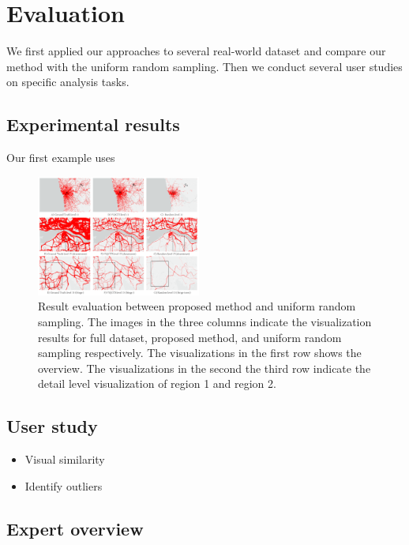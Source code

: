 \section{Evaluation}
We first applied our approaches to several real-world dataset and compare our method with the uniform random sampling. Then we conduct several user studies on specific analysis tasks. 
\subsection{Experimental results}

Our first example uses 


\begin{figure}[t]
	\centering
	\includegraphics[width=0.48\textwidth]{pictures/experiment_study/Mehtod_resolution_study.pdf}
	\vspace{-5mm}
	\caption{Result evaluation between proposed method and uniform random sampling. The images in the three columns indicate the visualization results for full dataset, proposed method, and uniform random sampling respectively. The visualizations in the first row shows the overview. The visualizations in the second the third row indicate the detail level visualization of region 1 and region 2. }
	\vspace{-5mm}
	\label{fig:one_to_many}
\end{figure}


\subsection{User study}
\begin{itemize}[noitemsep]
    \item Visual similarity
    \item Identify outliers
\end{itemize}

\subsection{Expert overview}

